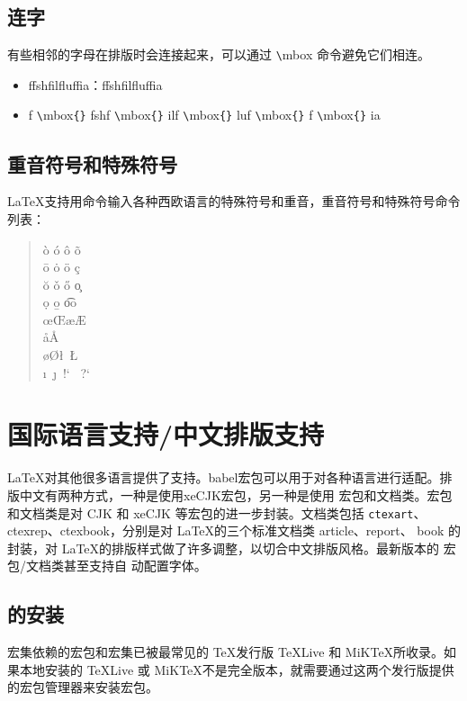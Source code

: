 \documentclass[UTF8]{ctexart}
\begin{document}
\subsection{连字}
有些相邻的字母在排版时会连接起来，可以通过 \texttt{\textbackslash}mbox{} 命令避免它们相连。
\begin{itemize}
  \item f\mbox{}fshf\mbox{}ilf\mbox{}luf\mbox{}f\mbox{}ia：ffshfilfluffia
  \item f \texttt{\textbackslash}mbox\texttt{\{}\texttt{\}} fshf \texttt{\textbackslash}mbox\texttt{\{}\texttt{\}} ilf \texttt{\textbackslash}mbox\texttt{\{}\texttt{\}}  luf \texttt{\textbackslash}mbox\texttt{\{}\texttt{\}}
  f \texttt{\textbackslash}mbox\texttt{\{}\texttt{\}} ia
\end{itemize}
\subsection{重音符号和特殊符号}
\LaTeX 支持用命令输入各种西欧语言的特殊符号和重音，重音符号和特殊符号命令列表：
\begin{quote}
  \`o  \qquad \'o  \qquad \^o  \qquad \~o \\
  \=o  \qquad \.o  \qquad \"o  \qquad \c c \\
  \u o \qquad \v o \qquad \H o \qquad \c o \\
  \d o \qquad \b o \qquad \t oo \\
  \oe  \qquad \OE  \qquad \ae  \qquad \AE \\
  \aa  \qquad \AA \\
  \o   \qquad  \O  \qquad \l  ~\qquad \L \\
  \i   ~\qquad  \j  ~\qquad  !`  ~\qquad ?` \\
\end{quote}

\section{国际语言支持/中文排版支持}
\LaTeX 对其他很多语言提供了支持。babel宏包可以用于对各种语言进行适配。排版中文有两种方式，一种是使用xeCJK宏包，另一种是使用 \CTeX 宏包和文档类。\CTeX 宏包和文档类是对 CJK 和 xeCJK 等宏包的进一步封装。文档类包括 \texttt{ctexart}、
ctexrep、ctexbook，分别是对 \LaTeX 的三个标准文档类 article、report、
book 的封装，对 \LaTeX 的排版样式做了许多调整，以切合中文排版风格。最新版本的 \CTeX 宏包/文档类甚至支持自
动配置字体。
\subsection{\CTeX 的安装}
   \CTeX 宏集依赖的宏包和宏集已被最常见的 \TeX 发行版 \TeX Live 和 MiK\TeX 所收录。如果本地安装的 \TeX Live 或
   MiK\TeX 不是完全版本，就需要通过这两个发行版提供的宏包管理器来安装宏包。
\end{document}
